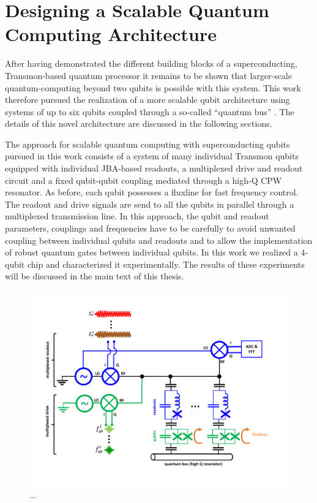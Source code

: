 \section{Designing a Scalable Quantum Computing Architecture}

After having demonstrated the different building blocks of a superconducting, Transmon-based quantum processor it remains to be shown that larger-scale quantum-computing beyond two qubits is possible with this system. This work therefore pursued the realization of a more scalable qubit architecture using systems of up to six qubits coupled through a so-called ``quantum bus'' \citep{majer_coupling_2007}. The details of this novel architecture are discussed in the following sections.

The approach for scalable quantum computing with superconducting qubits pursued in this work consists of a system of many individual Transmon qubits equipped with individual JBA-based readouts, a multiplexed drive and readout circuit and a fixed qubit-qubit coupling mediated through a high-Q CPW resonator. As before, each qubit possesses a fluxline for fast frequency control. The readout and drive signals are send to all the qubits in parallel through a multiplexed transmission line. In this approach, the qubit and readout parameters, couplings and frequencies have to be carefully to avoid unwanted coupling between individual qubits and readouts and to allow the implementation of robust quantum gates between individual qubits. In this work we realized a 4-qubit chip and characterized it experimentally. The results of these experiments will be discussed in the main text of this thesis.

\begin{figure}[ht!]
  \centering
	\includegraphics[width=1.\textwidth]{"./material/figures/scalable-architecture/scalable architecture - schematic"}
	\caption[...]{...}
\end{figure}
